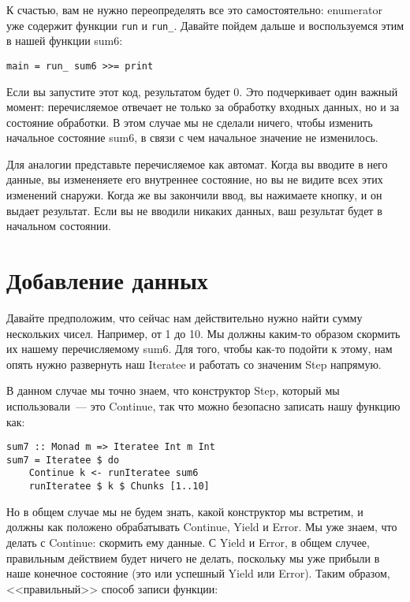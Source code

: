 К счастью, вам не нужно переопределять все это самостоятельно: enumerator уже содержит функции \lstinline'run' и \lstinline'run_'. Давайте пойдем дальше и воспользуемся этим в нашей функции sum6:

\begin{lstlisting}
main = run_ sum6 >>= print
\end{lstlisting}

Если вы запустите этот код, результатом будет 0. Это подчеркивает один важный момент: перечисляемое отвечает не только за обработку входных данных, но и за состояние обработки. В этом случае мы не сделали ничего, чтобы изменить начальное состояние sum6, в связи с чем начальное значение не изменилось.

Для аналогии представьте перечисляемое как автомат. Когда вы вводите в него данные, вы измененяете его внутреннее состояние, но вы не видите всех этих изменений снаружи. Когда же вы закончили ввод, вы нажимаете кнопку, и он выдает результат. Если вы не вводили никаких данных, ваш результат будет в начальном состоянии.

\section{Добавление данных}

Давайте предположим, что сейчас нам действительно нужно найти сумму нескольких чисел. Например, от 1 до 10. Мы должны каким-то образом скормить их нашему перечисляемому sum6. Для того, чтобы как-то подойти к этому, нам опять нужно развернуть наш Iteratee и работать со значеним Step напрямую.

В данном случае мы точно знаем, что конструктор Step, который мы использовали~--- это Continue, так что можно безопасно записать нашу функцию как:

\begin{lstlisting}
sum7 :: Monad m => Iteratee Int m Int
sum7 = Iteratee $ do
    Continue k <- runIteratee sum6
    runIteratee $ k $ Chunks [1..10]
\end{lstlisting}%

Но в общем случае мы не будем знать, какой конструктор мы встретим, и должны как положено обрабатывать Continue, Yield и Error. Мы уже знаем, что делать с Continue: скормить ему данные. С Yield и Error, в общем случее, правильным действием будет ничего не делать, поскольку мы уже прибыли в наше конечное состояние (это или успешный Yield или Error). Таким образом, <<правильный>> способ записи функции:

